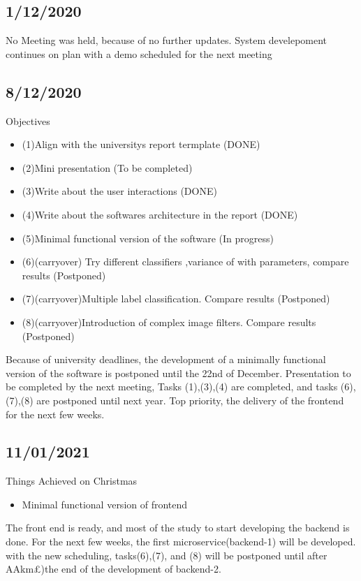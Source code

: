 \documentclass[a4paper,11pt,oneside]{book}
\begin{document}
	\subsection{1/12/2020}
	No Meeting was held, because of no further updates. System develepoment continues on plan
	with a demo scheduled for the next meeting
	\subsection{8/12/2020}
	Objectives
	\begin{itemize}
		\item (1)Align with the universitys report termplate (DONE)
		\item (2)Mini presentation (To be completed)
		\item (3)Write about the user interactions (DONE)
		\item (4)Write about the softwares architecture in the report (DONE)
		\item (5)Minimal functional version of the software (In progress)
		\item (6)(carryover) Try different classifiers ,variance of with parameters, compare results (Postponed)
		\item (7)(carryover)Multiple label classification. Compare results (Postponed)
		\item (8)(carryover)Introduction of complex image filters. Compare results (Postponed)
	\end{itemize}
	Because of university deadlines, the development of a minimally functional version of the software is postponed until the 22nd of December.
	Presentation to be completed by the next meeting, Tasks (1),(3),(4) are completed, and tasks (6),(7),(8) are postponed until next year.
	Top priority, the delivery of the frontend for the next few weeks.
	
	\subsection{11/01/2021}
	Things Achieved on Christmas
	
	\begin{itemize}
		\item Minimal functional version of frontend
	\end{itemize}
	The front end is ready, and most of the study to start developing the backend is done. For the next few weeks, the first 
	microservice(backend-1) will be developed. with the new scheduling, tasks(6),(7), and (8) will be postponed until after
	AAkm£)the end of the development of backend-2.
\end{document}
